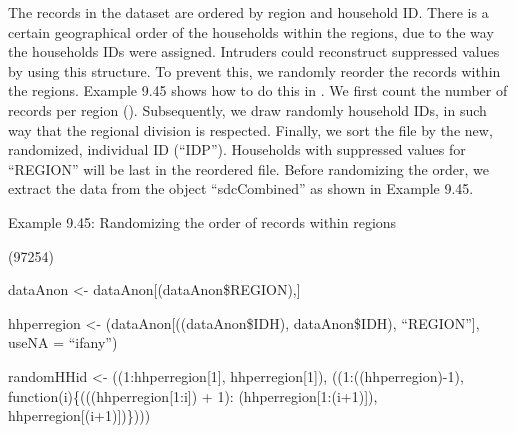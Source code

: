 \documentclass[letterpaper,10pt,english]{sphinxmanual}
\begin{document}

The records in the dataset are ordered by region and household ID. There
is a certain geographical order of the households within the regions,
due to the way the households IDs were assigned. Intruders could
reconstruct suppressed values by using this structure. To prevent this,
we randomly reorder the records within the regions. Example 9.45 shows
how to do this in . We first count the number of records per region
(). Subsequently, we draw randomly household IDs, in
such way that the regional division is respected. Finally, we sort the
file by the new, randomized, individual ID (“IDP”). Households with
suppressed values for “REGION” will be last in the reordered file.
Before randomizing the order, we extract the data from the 
object “sdcCombined” as shown in Example 9.45.

Example 9.45: Randomizing the order of records within regions

\begin{DUlineblock}{0em}
\item[] 
\item[] (97254)
\item[] 
\item[] dataAnon \textless{}- dataAnon{[}(dataAnon\$REGION),{]}
\end{DUlineblock}

\begin{DUlineblock}{0em}
\item[] 
\item[] hhperregion \textless{}-
(dataAnon{[}((dataAnon\$IDH),
dataAnon\$IDH), “REGION”{]}, useNA = “ifany”)
\item[] 
\item[] randomHHid \textless{}- ((1:hhperregion{[}1{]}, hhperregion{[}1{]}),
((1:((hhperregion)-1),
function(i)\{(((hhperregion{[}1:i{]}) + 1):
(hhperregion{[}1:(i+1){]}), hhperregion{[}(i+1){]})\})))
\end{DUlineblock}
\end{document}
